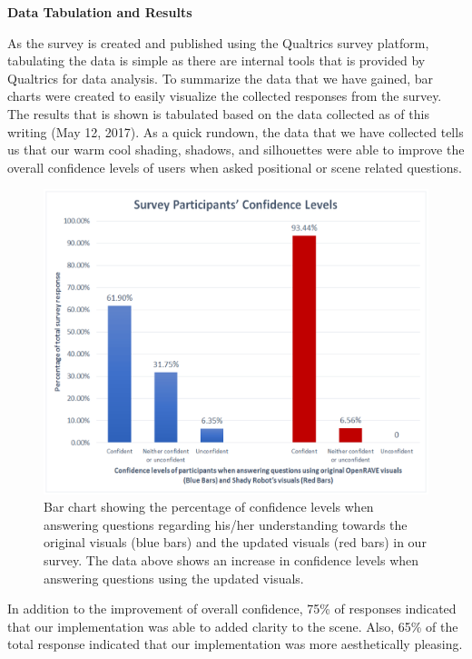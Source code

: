 \documentclass[10pt,journal,compsoc,draftclsnofoot]{IEEEtran}
\begin{document}
\begin{flushleft}
\newpage

\textbf{Data Tabulation and Results}
\par
As the survey is created and published using the Qualtrics survey platform, tabulating the data is simple as there are internal tools that is provided by Qualtrics for data analysis.
To summarize the data that we have gained, bar charts were created to easily visualize the collected responses from the survey.
The results that is shown is tabulated based on the data collected as of this writing (May 12, 2017).
As a quick rundown, the data that we have collected tells us that our warm cool shading, shadows, and silhouettes were able to improve the overall confidence levels of users when asked positional or scene related questions.

\begin{figure} [H]
  \includegraphics[scale=0.8]{ConfLevel.eps}
  \caption
{ \newline \hspace{\linewidth}
Bar chart showing the percentage of confidence levels when answering questions regarding his/her understanding towards the original visuals (blue bars) and the updated visuals (red bars) in our survey. The data above shows an increase in confidence levels when answering questions using the updated visuals.}
  \label{fig:Shadow}
\end{figure}

In addition to the improvement of overall confidence, 75\% of responses indicated that our implementation was able to added clarity to the scene.
Also, 65\% of the total response indicated that our implementation was more aesthetically pleasing.

\end{flushleft}
\end{document}
